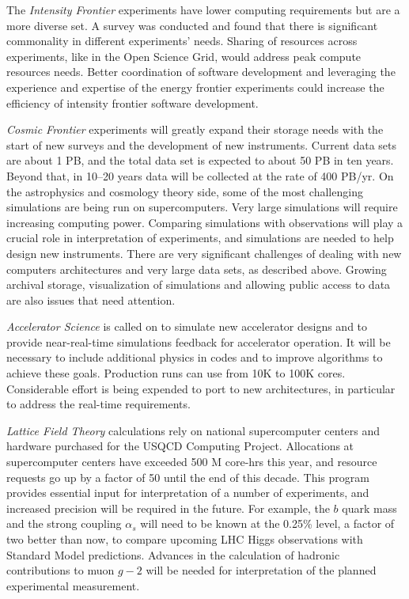 The {\it Intensity Frontier} experiments have lower computing requirements
but are a more diverse set. A survey was conducted and found that there is
significant commonality in different experiments' needs. Sharing of
resources across experiments, like in the Open Science Grid, would address
peak compute resources needs. Better coordination of software development
and leveraging the experience and expertise of the energy frontier
experiments could increase the efficiency of intensity frontier software
development.

{\it Cosmic Frontier} experiments will greatly expand their storage needs
with the start of new surveys and the development of new instruments.
Current data sets are about 1 PB, and the total data set is expected to
about 50 PB in ten years. Beyond that, in 10--20 years data will be
collected at the rate of 400 PB/yr. On the astrophysics and cosmology
theory side, some of the most challenging simulations are being run on
supercomputers. Very large simulations will require increasing computing
power. Comparing simulations with observations will play a crucial role in
interpretation of experiments, and simulations are needed to help design
new instruments. There are very significant challenges of dealing with new
computers architectures and very large data sets, as described above.
Growing archival storage, visualization of simulations and allowing public
access to data are also issues that need attention.

{\it Accelerator Science} is called on to simulate new accelerator designs
and to provide near-real-time simulations feedback for accelerator
operation. It will be necessary to include additional physics in codes and
to improve algorithms to achieve these goals. Production runs can use from
10K to 100K cores. Considerable effort is being expended to port to new
architectures, in particular to address the real-time requirements.

{\it Lattice Field Theory} calculations rely on national supercomputer
centers and hardware purchased for the USQCD Computing Project. Allocations
at supercomputer centers have exceeded 500 M core-hrs this year, and
resource requests go up by a factor of 50 until the end of this decade.
This program provides essential input for interpretation of a number of
experiments, and increased precision will be required in the future. For
example, the $b$ quark mass and the strong coupling $\alpha_s$ will need to
be known at the 0.25\% level, a factor of two better than now, to compare
upcoming LHC Higgs observations with Standard Model predictions. Advances
in the calculation of hadronic contributions to muon $g-2$ will be needed
for interpretation of the planned experimental measurement.

